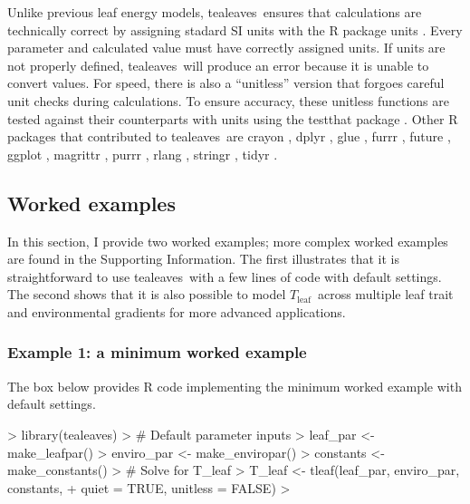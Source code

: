 \documentclass[11pt, oneside]{article}
\newcommand{\pkg}[1]{{\fontseries{b}\selectfont #1}}
\newcommand{\tealeaves}{\pkg{tealeaves}}
\newcommand{\tleaf}{$T_\mathrm{leaf}$}
\begin{document}
Unlike previous leaf energy models, \tealeaves~ensures that calculations are technically correct by assigning stadard SI units with the R package \pkg{units} \cite{Pebesma_etal_2016}. Every parameter and calculated value must have correctly assigned units. If units are not properly defined, \tealeaves~will produce an error because it is unable to convert values. For speed, there is also a ``unitless'' version that forgoes careful unit checks during calculations. To ensure accuracy, these unitless functions are tested against their counterparts with units using the \pkg{testthat} package \citep{Wickham_2011b}. Other R packages that contributed to \tealeaves~are \pkg{crayon} \citep{Csardi_2017}, \pkg{dplyr} \citep{Wickham_etal_2018}, \pkg{glue} \citep{Hester_2018}, \pkg{furrr} \citep{Vaughan_Dancho_2018}, \pkg{future} \citep{Bengtsson_2018}, \pkg{ggplot} \citep{Wickham_2016}, \pkg{magrittr} \citep{Bache_Wickham_2014}, \pkg{purrr} \citep{Henry_Wickham_2018b}, \pkg{rlang} \citep{Henry_Wickham_2018a}, \pkg{stringr} \citep{Wickham_2018}, \pkg{tidyr} \citep{Wickham_Henry_2018}.

\subsection*{Worked examples}

In this section, I provide two worked examples; more complex worked examples are found in the Supporting Information. The first illustrates that it is straightforward to use \tealeaves~with a few lines of code with default settings. The second shows that it is also possible to model \tleaf~across multiple leaf trait and environmental gradients for more advanced applications.

\subsubsection*{Example 1: a minimum worked example}

The box below provides R code implementing the minimum worked example with default settings.

\begin{Schunk}
\begin{Sinput}
>   library(tealeaves)
>   # Default parameter inputs  
>   leaf_par   <- make_leafpar()
>   enviro_par <- make_enviropar()
>   constants  <- make_constants()
>   # Solve for T_leaf
>   T_leaf <- tleaf(leaf_par, enviro_par, constants, 
+                   quiet = TRUE, unitless = FALSE)
> 
\end{Sinput}
\end{Schunk}
\end{document}
